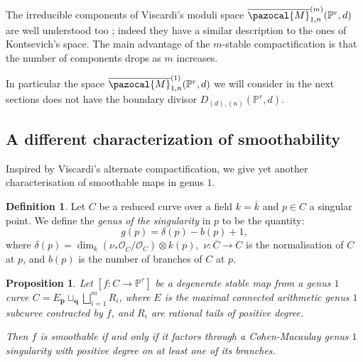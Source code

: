 \documentclass[11pt]{amsart}
\newcommand{\PP}{\mathbb P}
\newcommand{\OO}{\mathcal O}
\renewcommand{\to}{\rightarrow}
\theoremstyle{plain}
\newtheorem{prop}[thm]{Proposition}
\newtheorem{cor}[thm]{Corollary}
\theoremstyle{definition}
\newtheorem{dfn}[thm]{Definition}
\begin{document}
The irreducible components of Viscardi's moduli space $\overline{\pazocal{M}}^{(m)}_{1,n}(\PP^r,d)$ are well understood too \cite[Thm.~5.9]{VISC}; indeed they have a similar description to the ones of Kontsevich's space. The main advantage of the $m$-stable compactification is that the number of components drops as $m$ increases.

In particular the space $\overline{\pazocal{M}}^{(1)}_{1,n}(\PP^r,d)$ we will consider in the next sections does not have the boundary divisor $D_{(d),(n)}(\PP^r,d).$
 
 \subsection{A different characterization of smoothability}
 Inspired by Viscardi's alternate compactification, we give yet another characterisation of smoothable maps in genus $1.$
 \begin{dfn}
 Let $C$ be a reduced curve over a field $k=\bar k$ and $p\in C$ a singular point. We define the \emph{genus of the singularity} in $p$ to be the quantity: \[g(p)=\delta(p)-b(p)+1,\] where $\delta(p)=\dim_k(\nu_*\OO_{\overline C}/\OO_C)\otimes k(p),$ $\nu\colon\overline{C}\to C$ is the normalisation of $C$ at $p$, and $b(p)$ is the number of branches of $C$ at $p.$
 \end{dfn}

 \begin{prop}\label{prop:smoothability2}
 Let $[f\colon C\to \PP^r]$ be a degenerate stable map from a genus $1$ curve $C=E {}_{\mathbf p}\!\sqcup_{\mathbf q}\bigsqcup_{i=1}^m R_i$, where $E$ is the maximal connected arithmetic genus $1$ subcurve contracted by $f$, and $R_i$ are rational tails of positive degree. 
  
  Then $f$ is smoothable if and only if it factors through a Cohen-Macaulay genus $1$ singularity with positive degree on at least one of its branches.
\end{prop}
\end{document}

